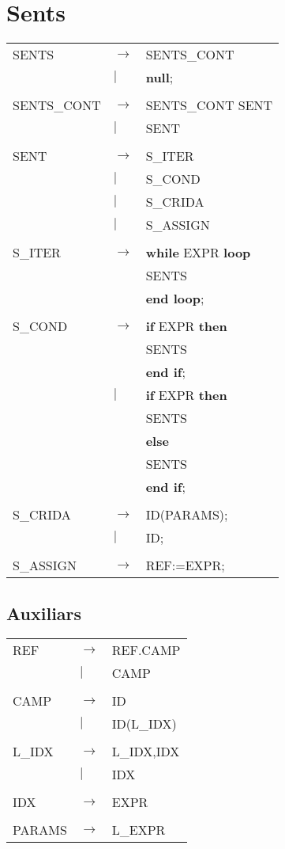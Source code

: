 \documentclass{article}
\begin{document}
	\section{Sents}
	\begin{tabular}{l l l}
		SENTS&$\to$&SENTS\_CONT\\
		&$|$&\textbf{null};\\
		\\
		SENTS\_CONT&$\to$&SENTS\_CONT SENT\\
		&$|$&SENT\\
		\\
		SENT&$\to$&S\_ITER\\
		&$|$&S\_COND\\
		&$|$&S\_CRIDA\\
		&$|$&S\_ASSIGN\\
		\\
		S\_ITER&$\to$&\textbf{while} EXPR \textbf{loop}\\
		&&\hspace*{5mm}SENTS\\
		&&\textbf{end loop};\\
		\\
		S\_COND&$\to$&\textbf{if} EXPR \textbf{then}\\
		&&\hspace*{5mm}SENTS\\
		&&\textbf{end if};\\
		&$|$&\textbf{if} EXPR \textbf{then}\\
		&&\hspace*{5mm}SENTS\\
		&&\textbf{else}\\
		&&\hspace*{5mm}SENTS\\
		&&\textbf{end if};\\
		\\
		S\_CRIDA&$\to$&ID(PARAMS);\\
		&$|$&ID;\\
		\\
		S\_ASSIGN&$\to$&REF:=EXPR;
	\end{tabular}
	\subsection{Auxiliars}
	\begin{tabular}{l l l}
		REF&$\to$&REF.CAMP\\
		&$|$&CAMP\\
		\\
		CAMP&$\to$&ID\\
		&$|$&ID(L\_IDX)\\
		\\
		L\_IDX&$\to$&L\_IDX,IDX\\
		&$|$&IDX\\
		\\
		IDX&$\to$&EXPR\\
		\\
		PARAMS&$\to$&L\_EXPR
	\end{tabular}
\end{document}

